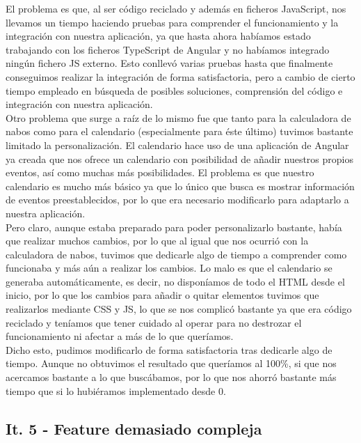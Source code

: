 El problema es que, al ser código reciclado y además en ficheros JavaScript, nos llevamos un tiempo haciendo pruebas para comprender el funcionamiento y la integración con nuestra aplicación, ya que hasta ahora habíamos estado trabajando con los ficheros TypeScript de Angular y no habíamos integrado ningún fichero JS externo. Esto conllevó varias pruebas hasta que finalmente conseguimos realizar la integración de forma satisfactoria, pero a cambio de cierto tiempo empleado en búsqueda de posibles soluciones, comprensión del código e integración con nuestra aplicación.\\

Otro problema que surge a raíz de lo mismo fue que tanto para la calculadora de nabos como para el calendario (especialmente para éste último) tuvimos bastante limitado la personalización. El calendario hace uso de una aplicación de Angular ya creada que nos ofrece un calendario con posibilidad de añadir nuestros propios eventos, así como muchas más posibilidades. El problema es que nuestro calendario es mucho más básico ya que lo único que busca es mostrar información de eventos preestablecidos, por lo que era necesario modificarlo para adaptarlo a nuestra aplicación.\\

Pero claro, aunque estaba preparado para poder personalizarlo bastante, había que realizar muchos cambios, por lo que al igual que nos ocurrió con la calculadora de nabos, tuvimos que dedicarle algo de tiempo a comprender como funcionaba y más aún a realizar los cambios. Lo malo es que el calendario se generaba automáticamente, es decir, no disponíamos de todo el HTML desde el inicio, por lo que los cambios para añadir o quitar elementos tuvimos que realizarlos mediante CSS y JS, lo que se nos complicó bastante ya que era código reciclado y teníamos que tener cuidado al operar para no destrozar el funcionamiento ni afectar a más de lo que queríamos.\\

Dicho esto, pudimos modificarlo de forma satisfactoria tras dedicarle algo de tiempo. Aunque no obtuvimos el resultado que queríamos al 100\%, si que nos acercamos bastante a lo que buscábamos, por lo que nos ahorró bastante más tiempo que si lo hubiéramos implementado desde 0.

\subsection{It. 5 - Feature demasiado compleja}

